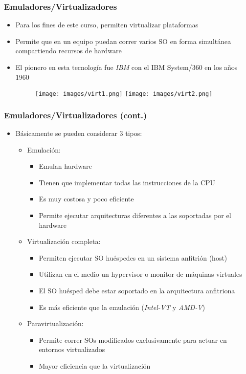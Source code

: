 \begin{frame}
	\frametitle{Emuladores/Virtualizadores}
	\begin{itemize}
		\item Para los fines de este curso, permiten virtualizar plataformas
		\item Permite que en un equipo puedan correr varios SO en forma simultánea compartiendo recursos de hardware
		\item El pionero en esta tecnología fue \emph{IBM} con el IBM System/360 en los años 1960
		\begin{figure}[h]
			\texttt{[image: images/virt1.png]}
			\hspace{30px}
			\texttt{[image: images/virt2.png]}
		\end{figure}
	\end{itemize}
\end{frame}

\begin{frame}
	\frametitle{Emuladores/Virtualizadores (cont.)}
	\begin{itemize}
		\item Básicamente se pueden considerar 3 tipos:	
		\begin{itemize}
			\item Emulación:
			\begin{itemize}
				\item Emulan hardware
				\item Tienen que implementar todas las instrucciones de la CPU
				\item Es muy costosa y poco eficiente
				\item Permite ejecutar arquitecturas diferentes a las soportadas por el hardware
			\end{itemize}
			\item Virtualización completa:
			\begin{itemize}
				\item Permiten ejecutar SO huéspedes en un sistema anfitrión (host)
				\item Utilizan en el medio un hypervisor o monitor de máquinas virtuales
				\item El SO huésped debe estar soportado en la arquitectura anfitriona
				\item Es más eficiente que la emulación (\emph{Intel-VT} y \emph{AMD-V})
			\end{itemize}
			\item Paravirtualización:
			\begin{itemize}
				\item Permite correr SOs modificados exclusivamente para actuar en entornos virtualizados
				\item Mayor eficiencia que la virtualización
			\end{itemize}			
		\end{itemize}		
	\end{itemize}
\end{frame}

